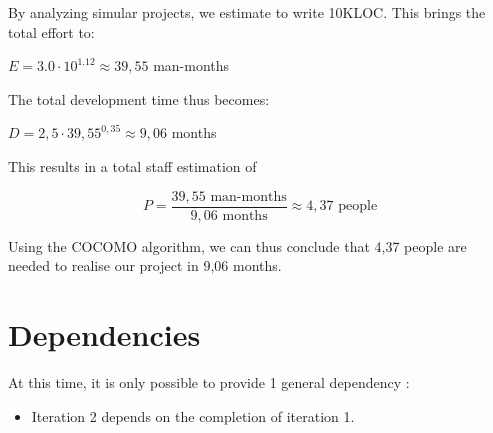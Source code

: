 \documentclass[salesmen, twoside]{../../../templates/latex/2009/softproj}
\begin{document}
\begin{projdoc}
			By analyzing simular projects, we estimate to write 10KLOC. This brings the total
			effort to:
			
			\begin{center}
				$ E = 3.0 \cdot 10^{1.12} \approx 39,55 $ man-months
			\end{center}
			
			The total development time thus becomes:
			
			\begin{center}
				$ D = 2,5 \cdot 39,55^{0,35} \approx 9,06 $ months
			\end{center}
			
			This results in a total staff estimation of
			
				\[ P = \frac{39,55 \textrm{ man-months}}{9,06 \textrm{ months}} \approx 4,37 \textrm{ people} \]
			
			Using the COCOMO algorithm, we can thus conclude that 4,37 people are needed to
			realise our project in 9,06 months. 
			
			\section {Dependencies}
			
			At this time, it is only possible to provide 1 general dependency :
			
			\begin{itemize}
				
				\item Iteration 2 depends on the completion of iteration 1.
				
			\end{itemize}
			
			

\end{projdoc}
\end{document}
